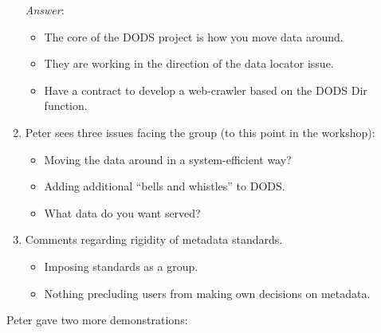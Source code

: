 \begin{enumerate}
\emph{Answer}:
\begin{itemize}
  \item The core of the DODS project is how you move data around.
  \item They are working in the direction of the data locator issue.
  \item Have a contract to develop a web-crawler based on the DODS Dir function.
\end{itemize}

\item Peter sees three issues facing the group (to this point in the workshop):
\begin{itemize}
  \item Moving the data around in a system-efficient way?
  \item Adding additional ``bells and whistles'' to DODS.
  \item What data do you want served?
\end{itemize}

\item Comments regarding rigidity of metadata standards.
\begin{itemize}
  \item Imposing standards as a group.
  \item Nothing precluding users from making own decisions on metadata.
\end{itemize}
\end{enumerate}

Peter gave two more demonstrations:

